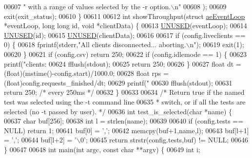 \begin{DoxyCode}
{{{{{{{{{{{{{{{{{{00607 \textcolor{stringliteral}{" with a range of values selected by the -r option.\(\backslash\)n"}
00608     );
00609     exit(exit\_status);
00610 \}
00611 
00612 \textcolor{keywordtype}{int} showThroughput(\textcolor{keyword}{struct} \hyperlink{structaeEventLoop}{aeEventLoop} *eventLoop, \textcolor{keywordtype}{long} \textcolor{keywordtype}{long} id, \textcolor{keywordtype}{void} *clientData) \{
00613     \hyperlink{server_8h_ae7c9dc8f13568a9c856573751f1ee1ec}{UNUSED}(eventLoop);
00614     \hyperlink{server_8h_ae7c9dc8f13568a9c856573751f1ee1ec}{UNUSED}(id);
00615     \hyperlink{server_8h_ae7c9dc8f13568a9c856573751f1ee1ec}{UNUSED}(clientData);
00616 
00617     \textcolor{keywordflow}{if} (config.liveclients == 0) \{
00618         fprintf(stderr,\textcolor{stringliteral}{"All clients disconnected... aborting.\(\backslash\)n"});
00619         exit(1);
00620     \}
00621     \textcolor{keywordflow}{if} (config.csv) \textcolor{keywordflow}{return} 250;
00622     \textcolor{keywordflow}{if} (config.idlemode == 1) \{
00623         printf(\textcolor{stringliteral}{"clients: %
00624         fflush(stdout);
00625     \textcolor{keywordflow}{return} 250;
00626     \}
00627     \textcolor{keywordtype}{float} dt = (\textcolor{keywordtype}{float})(mstime()-config.start)/1000.0;
00628     \textcolor{keywordtype}{float} rps = (\textcolor{keywordtype}{float})config.requests\_finished/dt;
00629     printf(\textcolor{stringliteral}{"%
00630     fflush(stdout);
00631     \textcolor{keywordflow}{return} 250; \textcolor{comment}{/* every 250ms */}
00632 \}
00633 
00634 \textcolor{comment}{/* Return true if the named test was selected using the -t command line}
00635 \textcolor{comment}{ * switch, or if all the tests are selected (no -t passed by user). */}
00636 \textcolor{keywordtype}{int} test\_is\_selected(\textcolor{keywordtype}{char} *name) \{
00637     \textcolor{keywordtype}{char} buf[256];
00638     \textcolor{keywordtype}{int} l = strlen(name);
00639 
00640     \textcolor{keywordflow}{if} (config.tests == NULL) \textcolor{keywordflow}{return} 1;
00641     buf[0] = \textcolor{stringliteral}{','};
00642     memcpy(buf+1,name,l);
00643     buf[l+1] = \textcolor{stringliteral}{','};
00644     buf[l+2] = \textcolor{stringliteral}{'\(\backslash\)0'};
00645     \textcolor{keywordflow}{return} strstr(config.tests,buf) != NULL;
00646 \}
00647 
00648 \textcolor{keywordtype}{int} main(\textcolor{keywordtype}{int} argc, \textcolor{keyword}{const} \textcolor{keywordtype}{char} **argv) \{
00649     \textcolor{keywordtype}{int} i;
}}}}}}}}}}}}}}}}}}}}
\end{DoxyCode}
